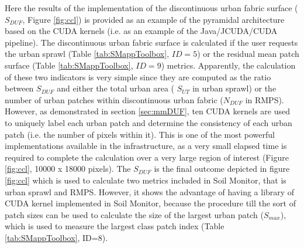 \documentclass[APA,LATO1COL,doublespace]{WileyNJD-v2}
\newcommand{\toberevised}[1]{\emph{\textcolor{red}{#1}}} %
\begin{document}
Here the results of the implementation of the discontinuous urban fabric surface ($S_{DUF}$, Figure \ref{fig:ccl}) is provided as an example of the pyramidal architecture based on the CUDA kernels (i.e. as an example of the Java/JCUDA/CUDA pipeline).
The discontinuous urban fabric surface is calculated if the user requests the urban sprawl (Table \ref{tab:SMappToolbox}, $ID = 5$) or the residual mean patch surface (Table \ref{tab:SMappToolbox}, $ID = 9$) metrics.
Apparently, the calculation of these two indicators is very simple since they are computed as the ratio between 
$S_{DUF}$ and either the total urban area ( $S_{UT}$ in urban sprawl) or the number of urban patches within discontinuous urban fabric ($N_{DUF}$ in RMPS).
However, as demonstrated in section \ref{sec:mmDUF}, ten CUDA kernels are used to uniquely label each urban patch and determine the consistency of each urban patch (i.e. the number of pixels within it).
This is one of the most powerful implementations available in the infrastructure, as a very small elapsed time is required to complete the calculation over a very large region of interest (Figure \ref{fig:ccl}, 10000 x 18000 pixels).
The $S_{DUF}$  is the final outcome depicted in figure \ref{fig:ccl} which is used to calculate two metrics included in Soil Monitor, that is urban sprawl and RMPS.
However, it shows the advantage of having a library of CUDA kernel implemented in Soil Monitor, because the procedure till the sort of patch sizes can be used to calculate the size of the largest urban patch ($S_{max}$), which is used to measure the largest class patch index (Table \ref{tab:SMappToolbox}, ID=8).

\end{document}
